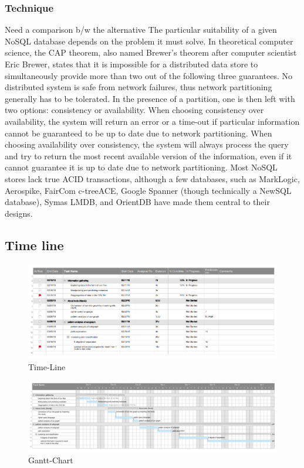 \subsubsection{Technique}
Need a comparison b/w the alternative The particular suitability of a given NoSQL database depends on the problem it must solve. In theoretical computer science, the CAP theorem, also named Brewer's theorem after computer scientist Eric Brewer, states that it is impossible for a distributed data store to simultaneously provide more than two out of the following three guarantees. No distributed system is safe from network failures, thus network partitioning generally has to be tolerated. In the presence of a partition, one is then left with two options: consistency or availability. When choosing consistency over availability, the system will return an error or a time-out if particular information cannot be guaranteed to be up to date due to network partitioning. When choosing availability over consistency, the system will always process the query and try to return the most recent available version of the information, even if it cannot guarantee it is up to date due to network partitioning. Most NoSQL stores lack true ACID transactions, although a few databases, such as MarkLogic, Aerospike, FairCom c-treeACE, Google Spanner (though technically a NewSQL database), Symas LMDB, and OrientDB have made them central to their designs.

\subsection{Time line}

\begin{figure}[h]
\centering
\includegraphics[width=\textwidth]{images/timeline.png}
\caption{Time-Line}
\end{figure}


\begin{figure}[h]
\centering
\includegraphics[width=\textwidth]{images/gantt-chart.png}
\caption{Gantt-Chart}
\end{figure}

